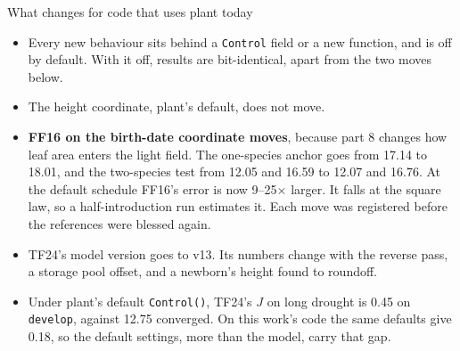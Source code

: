\documentclass[aspectratio=169,10pt]{beamer}
\begin{document}
\begin{frame}{What changes for code that uses plant today}
  \small
  \begin{itemize}
    \item Every new behaviour sits behind a \texttt{Control} field or a new function, and is off
      by default. With it off, results are bit-identical, apart from the two moves below.
    \item The height coordinate, plant's default, does not move.
    \item \textbf{FF16 on the birth-date coordinate moves}, because part 8 changes how leaf area
      enters the light field. The one-species anchor goes from 17.14 to 18.01, and the
      two-species test from 12.05 and 16.59 to 12.07 and 16.76. At the default schedule FF16's
      error is now 9--25$\times$ larger. It falls at the square law, so a half-introduction run
      estimates it. Each move was registered before the references were blessed again.
    \item TF24's model version goes to v13. Its numbers change with the reverse pass, a storage
      pool offset, and a newborn's height found to roundoff.
    \item Under plant's default \texttt{Control()}, TF24's $J$ on long drought is 0.45 on
      \texttt{develop}, against 12.75 converged. On this work's code the same defaults give 0.18,
      so the default settings, more than the model, carry that gap.
  \end{itemize}
\end{frame}
\end{document}
